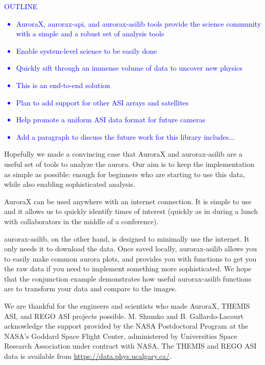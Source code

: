 \documentclass[draft]{agujournal2019}
\begin{document}
\textcolor{blue}{
      OUTLINE
      \begin{itemize}
            \item AuroraX, aurorax-api, and aurorax-asilib tools provide the science community with a simple and a robust set of analysis tools
            \item Enable system-level science to be easily done
            \item Quickly sift through an immense volume of data to uncover new physics
            \item This is an end-to-end solution
            \item Plan to add support for other ASI arrays and satellites
            \item Help promote a uniform ASI data format for future cameras
            \item Add a paragraph to discuss the future work for this library includes...
      \end{itemize}
}
Hopefully we made a convincing case that AuroraX and aurorax-asilib are a useful set of tools to analyze the aurora. Our aim is to keep the implementation as simple as possible: enough for beginners who are starting to use this data, while also enabling sophisticated analysis.

AuroraX can be used anywhere with an internet connection. It is simple to use and it allows us to quickly identify times of interest (quickly as in during a lunch with collaborators in the middle of a conference).

aurorax-asilib, on the other hand, is designed to minimally use the internet. It only needs it to download the data. Once saved locally, aurorax-asilib allows you to easily make common aurora plots, and provides you with functions to get you the raw data if you need to implement something more sophisticated. We hope that the conjunction example demonstrates how useful aurorax-asilib functions are to transform your data and compare to the images.

\acknowledgments
We are thankful for the engineers and scientists who made AuroraX, THEMIS ASI, and REGO ASI projects possible. M. Shumko and B. Gallardo-Lacourt acknowledge the support provided by the NASA Postdoctoral Program at the NASA’s Goddard Space Flight Center, administered by Universities Space Research Association under contract with NASA. The THEMIS and REGO ASI data is available from \url{https://data.phys.ucalgary.ca/}.

% 
\end{document}

